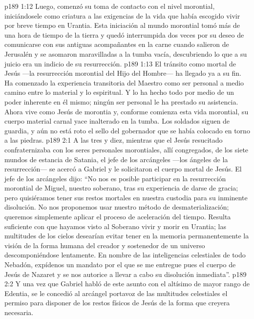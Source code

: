 \vs p189 1:12 Luego, comenzó su toma de contacto con el nivel morontial, iniciándosele como criatura a las exigencias de la vida que había escogido vivir por breve tiempo en Urantia. Esta iniciación al mundo morontial tomó más de una hora de tiempo de la tierra y quedó interrumpida dos veces por su deseo de comunicarse con sus antiguas acompañantes en la carne cuando salieron de Jerusalén y se asomaron maravilladas a la tumba vacía, descubriendo lo que a su juicio era un indicio de su resurrección.
\vs p189 1:13 El tránsito como mortal de Jesús ---la resurrección morontial del Hijo del Hombre--- ha llegado ya a su fin. Ha comenzado la experiencia transitoria del Maestro como ser personal a medio camino entre lo material y lo espiritual. Y lo ha hecho todo por medio de un poder inherente en él mismo; ningún ser personal le ha prestado su asistencia. Ahora vive como Jesús de morontia y, conforme comienza esta vida morontial, su cuerpo material carnal yace inalterado en la tumba. Los soldados siguen de guardia, y aún no está roto el sello del gobernador que se había colocado en torno a las piedras.
\vs p189 2:1 A las tres y diez, mientras que el Jesús resucitado confraternizaba con los seres personales morontiales, allí congregados, de los siete mundos de estancia de Satania, el jefe de los arcángeles ---los ángeles de la resurrección--- se acercó a Gabriel y le solicitaron el cuerpo mortal de Jesús. El jefe de los arcángeles dijo: “No nos es posible participar en la resurrección morontial de Miguel, nuestro soberano, tras su experiencia de darse de gracia; pero quisiéramos tener sus restos mortales en nuestra custodia para su inminente disolución. No nos proponemos usar nuestro método de desmaterialización; queremos simplemente aplicar el proceso de aceleración del tiempo. Resulta suficiente con que hayamos visto al Soberano vivir y morir en Urantia; las multitudes de los cielos desearían evitar tener en la memoria permanentemente la visión de la forma humana del creador y sostenedor de un universo descomponiéndose lentamente. En nombre de las inteligencias celestiales de todo Nebadón, expídenos un mandato por el que se me entregue pues el cuerpo de Jesús de Nazaret y se nos autorice a llevar a cabo su disolución inmediata”.
\vs p189 2:2 Y una vez que Gabriel habló de este asunto con el altísimo de mayor rango de Edentia, se le concedió al arcángel portavoz de las multitudes celestiales el permiso para disponer de los restos físicos de Jesús de la forma que creyera necesaria.

